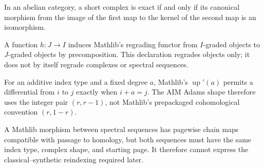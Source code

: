 \begin{theorem}
  \label{thm:mathlib-exact-iff-image-kernel}
  \mathlibok
  In an abelian category, a short complex is exact if and only if its canonical
  morphism from the image of the first map to the kernel of the second map is
  an isomorphism.
\end{theorem}

\begin{definition}
  \label{def:mathlib-graded-comap}
  \mathlibok
  A function $h:J\to I$ induces Mathlib's regrading functor from
  $I$-graded objects to $J$-graded objects by precomposition.  This declaration
  regrades objects only; it does not by itself regrade complexes or spectral
  sequences.
\end{definition}

\begin{definition}
  \label{def:mathlib-complex-shape-up}
  \mathlibok
  For an additive index type and a fixed degree $a$, Mathlib's
  $\operatorname{up}'(a)$ permits a differential from $i$ to $j$ exactly when
  $i+a=j$.  The AIM Adams shape therefore uses the integer pair
  $(r,r-1)$, not Mathlib's prepackaged cohomological convention $(r,1-r)$.
\end{definition}

\begin{definition}
  \label{def:mathlib-spectral-sequence-hom}
  \mathlibok
  A Mathlib morphism between spectral sequences has pagewise chain maps
  compatible with passage to homology, but both sequences must have the same
  index type, complex shape, and starting page.  It therefore cannot express
  the classical--synthetic reindexing required later.
\end{definition}

